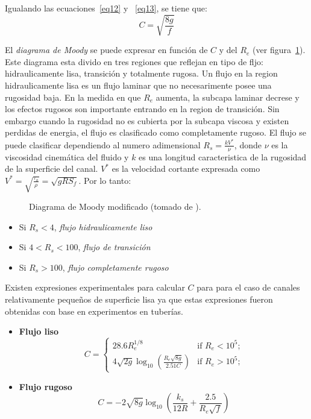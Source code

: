 \documentclass[11pt, oneside]{article}
\begin{document}
Igualando las ecuaciones~\ref{eq12} y ~\ref{eq13}, se tiene que:
\begin{equation}
C = \sqrt{\frac{8g}{f}}
\label{eq13}
\end{equation}

El \emph{diagrama de Moody} se puede expresar en funci\'on de $C$ y del $R_e$ (ver figura~\ref{fig3}). Este diagrama esta divido en tres regiones que reflejan en tipo de fljo: hidraulicamente lisa, transici\'on y totalmente rugosa. Un flujo en la region hidraulicamente lisa es un flujo laminar que no necesarimente posee una rugosidad baja. En la medida en que $R_e$  aumenta, la subcapa laminar decrese y los efectos rugosos son importante entrando en la region de transici\'on. Sin embargo cuando la rugosidad no es cubierta por la subcapa viscosa y existen perdidas de energia, el flujo es clasificado como completamente rugoso. El flujo se puede clasificar dependiendo  al numero adimensional $R_s = \frac{k V^* }{\nu}$, donde $\nu$ es la viscosidad cinem\'atica del fluido y $k$ es una longitud caracteristica de la rugosidad de la superficie del canal. $V^*$ es la velocidad cortante expresada como $V^* = \sqrt{\frac{\tau_o}{\rho}}=\sqrt{gR S_f}$. Por lo tanto:

\begin{figure}[h]
\centering
\caption{Diagrama de Moody modificado (tomado de \cite{Chau}).}
\label{fig3}
\end{figure}

\begin{itemize}
\item Si $R_s < 4$, \emph{flujo hidraulicamente liso}
\item Si $4 < R_s < 100$, \emph{flujo de transici\'on}
\item Si $R_s > 100$, \emph{flujo completamente rugoso} 
\end{itemize}
Existen expresiones experimentales para calcular $C$ para para el caso de canales relativamente pequeños de superficie lisa ya que estas expresiones fueron obtenidas con base en experimentos en tuber\'ias. 

\begin{itemize}
\item \textbf{Flujo liso}
\begin{equation}
C = \begin{cases}
28.6 R_e^{1/8} & \text{if $R_e < 10^5$;}\\
4\sqrt{2g}\log_{10} \left( \frac{R_e \sqrt{8g}}{2.51 C}\right) & \text{if $R_e > 10^5$;}
\end{cases}
\label{eq14}
\end{equation}

\item \textbf{Flujo rugoso}
\begin{equation}
C = -2\sqrt{8g}\log_{10} \left(\frac{k_s}{12R} + \frac{2.5}{R_e \sqrt{f}} \right)
\label{eq15}
\end{equation}
\end{itemize}
\end{document}
